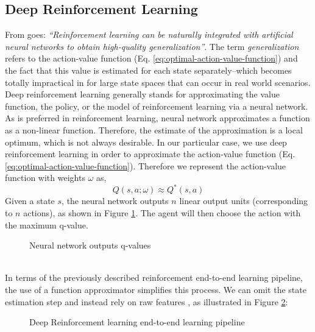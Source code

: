 \subsection{Deep Reinforcement Learning}

From \cite{deeprlcourse} goes: \textit{``Reinforcement learning can be naturally integrated with artificial neural networks to obtain high-quality generalization''}.
The term \textit{generalization} refers to the action-value function (Eq. \ref{eq:optimal-action-value-function}) and the fact that this value is estimated for each state separately--which becomes totally impractical in for large state spaces that can occur in real world scenarios.
Deep reinforcement learning generally stands for approximating the value function, the policy, or the model of reinforcement learning via a neural network.
As is preferred in reinforcement learning, neural network approximates a function as a non-linear function.
Therefore, the estimate of the approximation is a local optimum, which is not always desirable.
In our particular case, we use deep reinforcement learning in order to approximate the action-value function (Eq. \ref{eq:optimal-action-value-function}). 
Therefore we represent the action-value function with weights $\omega$ as,
\begin{equation}
Q(s, a; \omega) \approx Q^*(s,a)
\end{equation}
Given a state $s$, the neural network outputs $n$ linear output units (corresponding to $n$ actions), as shown in Figure \ref{fig:drl-qvalues}.
The agent will then choose the action with the maximum q-value.
\begin{figure}[H]
    \centering
    \caption{Neural network outputs q-values}
    \label{fig:drl-qvalues}
\end{figure}
\hfill
\\
In terms of the previously described reinforcement end-to-end learning pipeline, the use of a function approximator simplifies this process.
We can omit the state estimation step and instead rely on raw features \cite{mnih2013playing}, as illustrated in Figure \ref{fig:drl-pipeline}:
\begin{figure}[H]
    \centering
    \caption{Deep Reinforcement learning end-to-end learning pipeline}
    \label{fig:drl-pipeline}
\end{figure}
